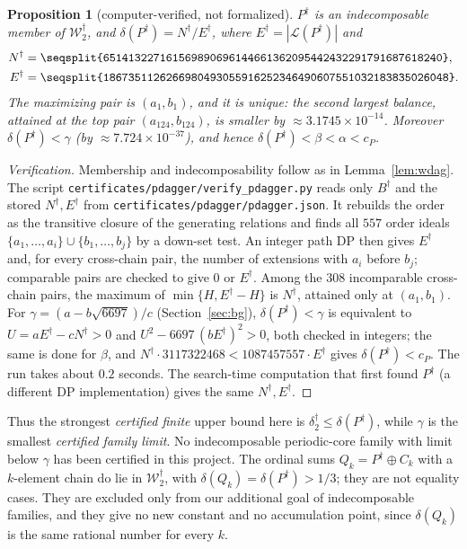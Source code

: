 \documentclass[11pt]{amsart}
\newtheorem{proposition}[theorem]{Proposition}
\theoremstyle{definition}
\theoremstyle{remark}
\newcommand{\Lin}{\mathcal{L}}
\newcommand{\Wdag}{\mathcal{W}_2^{\dagger}}
\newcommand{\deltadag}{\delta_2^{\dagger}}
\begin{document}
\begin{proposition}[computer-verified, not formalized]\label{prop:dagger}
$P^\dagger$ is an indecomposable member of $\Wdag$, and $\delta(P^\dagger)=N^\dagger/E^\dagger$, where $E^\dagger=|\Lin(P^\dagger)|$ and
\begin{align*}
N^\dagger&=\texttt{\seqsplit{651413227161569890696144661362095442432291791687618240}},\\
E^\dagger&=\texttt{\seqsplit{1867351126266980493055916252346490607551032183835026048}}.
\end{align*}
The maximizing pair is $(a_1,b_1)$, and it is unique: the second largest balance, attained at the top pair $(a_{124},b_{124})$, is smaller by $\approx3.1745\times10^{-14}$. Moreover $\delta(P^\dagger)<\gamma$ (by $\approx7.724\times10^{-37}$), and hence $\delta(P^\dagger)<\beta<\alpha<c_P$.
\end{proposition}
\begin{proof}[Verification]
Membership and indecomposability follow as in Lemma~\ref{lem:wdag}. The script \texttt{certificates/pdagger/verify\_pdagger.py} reads only $B^\dagger$ and the stored $N^\dagger,E^\dagger$ from \texttt{certificates/pdagger/pdagger.json}. It rebuilds the order as the transitive closure of the generating relations and finds all $557$ order ideals $\{a_1,\dots,a_i\}\cup\{b_1,\dots,b_j\}$ by a down-set test. An integer path DP then gives $E^\dagger$ and, for every cross-chain pair, the number of extensions with $a_i$ before $b_j$; comparable pairs are checked to give $0$ or $E^\dagger$. Among the $308$ incomparable cross-chain pairs, the maximum of $\min\{H,E^\dagger-H\}$ is $N^\dagger$, attained only at $(a_1,b_1)$. For $\gamma=(a-b\sqrt{6697})/c$ (Section~\ref{sec:bg}), $\delta(P^\dagger)<\gamma$ is equivalent to $U=aE^\dagger-cN^\dagger>0$ and $U^2-6697\,(bE^\dagger)^2>0$, both checked in integers; the same is done for $\beta$, and $N^\dagger\cdot3117322468<1087457557\cdot E^\dagger$ gives $\delta(P^\dagger)<c_P$. The run takes about $0.2$ seconds. The search-time computation that first found $P^\dagger$ (a different DP implementation) gives the same $N^\dagger,E^\dagger$.
\end{proof}

Thus the strongest \emph{certified finite} upper bound here is $\deltadag\le\delta(P^\dagger)$, while $\gamma$ is the smallest \emph{certified family limit}. No indecomposable periodic-core family with limit below $\gamma$ has been certified in this project. The ordinal sums $Q_k=P^\dagger\oplus C_k$ with a $k$-element chain do lie in $\Wdag$, with $\delta(Q_k)=\delta(P^\dagger)>1/3$; they are not equality cases. They are excluded only from our additional goal of indecomposable families, and they give no new constant and no accumulation point, since $\delta(Q_k)$ is the same rational number for every $k$.
\end{document}
